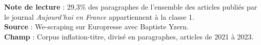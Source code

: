 \documentclass{article}
\newlength\holdLTleft
\newlength\holdLTright
\begin{document}
\begin{landscape}
\begin{longtable}
\end{longtable}

\begin{minipage}{\linewidth}
\textbf{Note de lecture} : 29,3\% des paragraphes de l'ensemble des articles publiés par le journal \emph{Aujourd'hui en France} appartiennent à la classe 1.\\
\textbf{Source} : We-scraping sur Europresse avec Baptiste Yzern.\\
\textbf{Champ} : Corpus inflation-titre, divisé en paragraphes, articles de 2021 à 2023.\\
\end{minipage}

\setlength\LTleft{\holdLTleft}
\setlength\LTright{\holdLTright}

\end{landscape}
\end{document}

